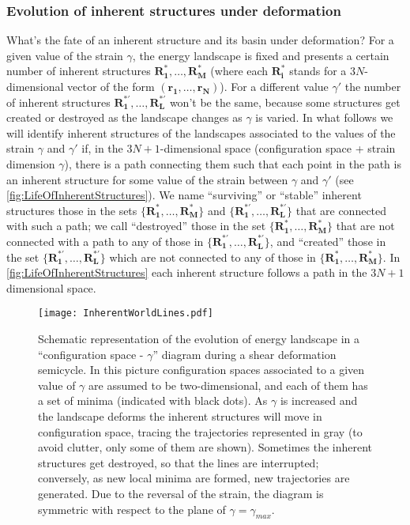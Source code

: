 \subsubsection{Evolution of inherent structures under deformation}
What's the fate of an inherent structure and its basin under deformation? For a given value of the strain $\gamma$, the energy landscape is fixed and presents a certain number of inherent structures $\mathbf{R_{1}^{*}, \ldots, R_{M}^{*}}$ (where each $\mathbf{R_{i}^{*}}$ stands for a $3N$-dimensional vector of the form $(\mathbf{r_{1}, \ldots, r_{N}})$). For a different value $\gamma'$ the number of inherent structures  $\mathbf{R_{1}^{*'}, \ldots, R_{L}^{*'}}$ won't be the same, because some structures get created or destroyed as the landscape changes as $\gamma$ is varied. In what follows we will identify inherent structures of the landscapes associated to the values of the strain $\gamma$ and $\gamma'$ if, in the $3N+1$-dimensional space (configuration space + strain dimension $\gamma$), there is a path connecting them such that each point in the path is an inherent structure for some value of the strain between $\gamma$ and $\gamma'$ (see \autoref{fig:LifeOfInherentStructures}). We name ``surviving'' or ``stable'' inherent structures those in the sets $\{\mathbf{R_{1}^{*}, \ldots, R_{M}^{*}}\}$ and $\{\mathbf{R_{1}^{*'}, \ldots, R_{L}^{*'}}\}$ that are connected with such a path; we call ``destroyed'' those in the set $\{\mathbf{R_{1}^{*}, \ldots, R_{M}^{*}}\}$ that are not connected with a path to any of those in $\{\mathbf{R_{1}^{*'}, \ldots, R_{L}^{*'}}\}$, and ``created'' those in the set $\{\mathbf{R_{1}^{*'}, \ldots, R_{L}^{*'}}\}$ which are not connected to any of those in $\{\mathbf{R_{1}^{*}, \ldots, R_{M}^{*}}\}$. In \autoref{fig:LifeOfInherentStructures} each inherent structure follows a path in the $3N + 1$ dimensional space.  

\begin{figure}[!h] 
\centering 
\texttt{[image: InherentWorldLines.pdf]} 
\caption{Schematic representation of the evolution of energy landscape in a ``configuration space - $\gamma$'' diagram during a shear deformation semicycle. In this picture configuration spaces associated to a given value of $\gamma$ are assumed to be two-dimensional, and each of them has a set of minima (indicated with black dots). As $\gamma$ is increased and the landscape deforms the inherent structures will move in configuration space, tracing the trajectories represented in gray (to avoid clutter, only some of them are shown). Sometimes the inherent structures get destroyed, so that the lines are interrupted; conversely, as new local minima are formed, new trajectories are generated. Due to the reversal of the strain, the diagram is symmetric with respect to the plane of $\gamma = \gamma_{max}$. \label{fig:LifeOfInherentStructures}}
\end{figure}


